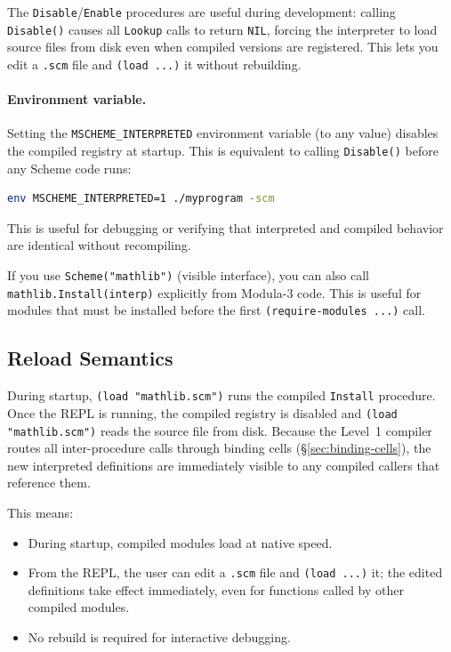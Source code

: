 \documentclass[12pt]{report}
\begin{document}
\noindent The \texttt{Disable}/\texttt{Enable} procedures are useful
during development: calling \texttt{Disable()} causes all
\texttt{Lookup} calls to return \texttt{NIL}, forcing the interpreter
to load source files from disk even when compiled versions are
registered.  This lets you edit a \texttt{.scm} file and
\texttt{(load ...)} it without rebuilding.

\paragraph{Environment variable.}
Setting the \texttt{MSCHEME\_INTERPRETED} environment variable
(to any value) disables the compiled registry at startup.  This is
equivalent to calling \texttt{Disable()} before any Scheme code runs:

\begin{lstlisting}[language=sh]
env MSCHEME_INTERPRETED=1 ./myprogram -scm
\end{lstlisting}

\noindent This is useful for debugging or verifying that interpreted
and compiled behavior are identical without recompiling.

If you use \texttt{Scheme("mathlib")} (visible interface), you can also
call \texttt{mathlib.Install(interp)} explicitly from Modula-3 code.
This is useful for modules that must be installed before
the first \texttt{(require-modules ...)} call.

\subsection{Reload Semantics}\label{sec:reload}

During startup, \texttt{(load "mathlib.scm")} runs the compiled
\texttt{Install} procedure.  Once the REPL is running, the compiled
registry is disabled and \texttt{(load "mathlib.scm")} reads the
source file from disk.  Because the Level~1 compiler routes all
inter-procedure calls through binding cells
(\S\ref{sec:binding-cells}), the new interpreted definitions are
immediately visible to any compiled callers that reference them.

This means:
\begin{itemize}
\item During startup, compiled modules load at native speed.
\item From the REPL, the user can edit a \texttt{.scm} file and
  \texttt{(load ...)} it; the edited definitions take effect
  immediately, even for functions called by other compiled modules.
\item No rebuild is required for interactive debugging.
\end{itemize}
\end{document}
